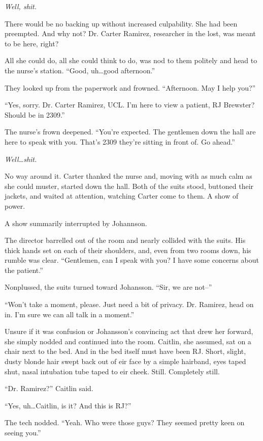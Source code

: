 \emph{Well, shit.}

There would be no backing up without increased culpability. She had been preempted. And why not? Dr. Carter Ramirez, researcher in the lost, was meant to be here, right?

All she could do, all she could think to do, was nod to them politely and head to the nurse's station. ``Good, uh\ldots{}good afternoon.''

They looked up from the paperwork and frowned. ``Afternoon. May I help you?''

``Yes, sorry. Dr. Carter Ramirez, UCL. I'm here to view a patient, RJ Brewster? Should be in 2309.''

The nurse's frown deepened. ``You're expected. The gentlemen down the hall are here to speak with you. That's 2309 they're sitting in front of. Go ahead.''

\emph{Well\ldots{}shit.}

No way around it. Carter thanked the nurse and, moving with as much calm as she could muster, started down the hall. Both of the suits stood, buttoned their jackets, and waited at attention, watching Carter come to them. A show of power.

A show summarily interrupted by Johannson.

The director barrelled out of the room and nearly collided with the suits. His thick hands set on each of their shoulders, and, even from two rooms down, his rumble was clear. ``Gentlemen, can I speak with you? I have some concerns about the patient.''

Nonplussed, the suits turned toward Johansson. ``Sir, we are not--''

``Won't take a moment, please. Just need a bit of privacy. Dr. Ramirez, head on in. I'm sure we can all talk in a moment.''

Unsure if it was confusion or Johansson's convincing act that drew her forward, she simply nodded and continued into the room. Caitlin, she assumed, sat on a chair next to the bed. And in the bed itself must have been RJ. Short, slight, dusty blonde hair swept back out of eir face by a simple hairband, eyes taped shut, nasal intubation tube taped to eir cheek. Still. Completely still.

``Dr. Ramirez?'' Caitlin said.

``Yes, uh\ldots{}Caitlin, is it? And this is RJ?''

The tech nodded. ``Yeah. Who were those guys? They seemed pretty keen on seeing you.''

